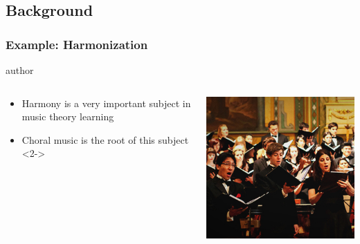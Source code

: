 \documentclass[english]{beamer}
\begin{document}
\subsection{Background}
\begin{frame}
	\frametitle{Example: Harmonization}
			\begin{beamercolorbox}[leftskip=8cm,center,wd=0.7\textwidth]{author}
			\begin{columns}[T]
			\begin{column}{.60\textwidth}%
\begin{itemize}
		\item \alert{Harmony} is a very important subject in music theory learning
		\item \alert{Choral} music is the root of this subject
		<2->
	\end{itemize}
			\end{column}
			\begin{column}{.39\textwidth}%
			\includegraphics[width=\linewidth]{imagenes/tsjsu_choir_02.jpg}
			\end{column}
			\end{columns}
			\end{beamercolorbox}
	
\end{frame}
\end{document}

